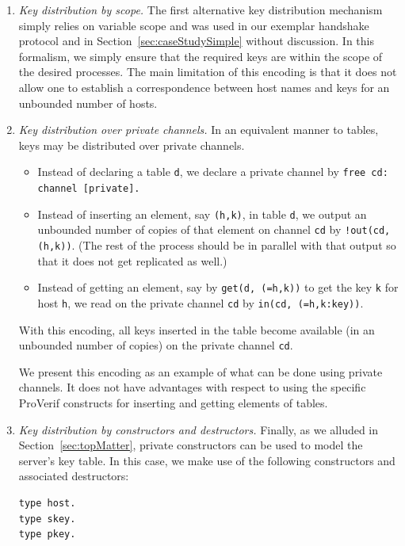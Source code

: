 \documentclass{book}
\begin{document}
\begin{enumerate}

\item \emph{Key distribution by scope.} The first alternative key distribution mechanism simply relies on variable scope and was used in our exemplar handshake protocol and in Section~\ref{sec:caseStudySimple} without discussion. In this formalism, we simply ensure that the required keys are within the scope of the desired processes. The main limitation of this encoding is that it does not allow one to establish a correspondence between host names and keys for an unbounded number of hosts.

\item \emph{Key distribution over private channels.} In an equivalent manner to tables, keys may be distributed over private channels.
\begin{itemize}

\item Instead of declaring a table \lstinline!d!, we declare a private channel by \lstinline!free cd: channel [private].!

\item Instead of inserting an element, say \lstinline!(h,k)!, in table \lstinline!d!, we output an unbounded number of copies of that element on channel \lstinline!cd! by \lstinline{!out(cd, (h,k))}. (The rest of the process should be in parallel with that output so that it does not get replicated as well.)

\item Instead of getting an element, say by \lstinline!get(d, (=h,k))!
  to get the key \lstinline!k! for host \lstinline!h!, we read on the
  private channel \lstinline!cd! by \lstinline!in(cd, (=h,k:key))!.

\end{itemize}
With this encoding, all keys inserted in the table become available
(in an unbounded number of copies) on the private channel \lstinline!cd!.

We present this encoding as an example of what can be done using
private channels. It does not have advantages with respect to using
the specific ProVerif constructs for inserting and getting elements of
tables.

\item \emph{Key distribution by constructors and destructors.} Finally, as we alluded in Section~\ref{sec:topMatter}, private constructors can be used to model the server's key table. In this case, we make use of the following constructors and associated destructors:
%
\begin{lstlisting}[numbers=none]
type host.
type skey.
type pkey.


\end{lstlisting}
\end{enumerate}
\end{document}
